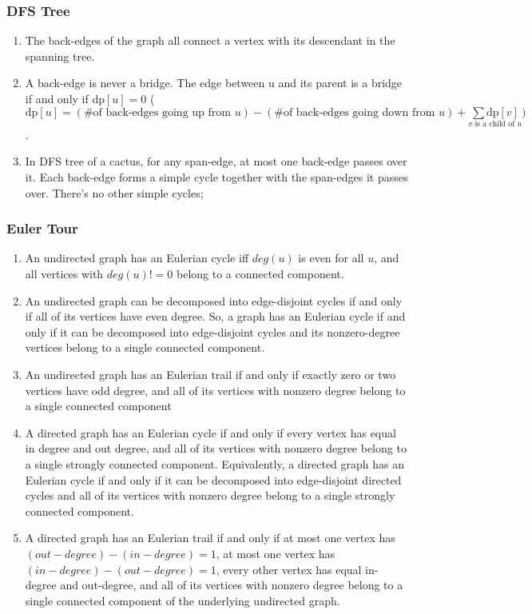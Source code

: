 \subsubsection{DFS Tree}
\begin{enumerate}
	\setlength\itemsep{-0.5em}
	\item The back-edges of the graph all connect a vertex with its descendant in the spanning tree.
	\item A back-edge is never a bridge. The edge between u and its parent is a bridge if and only if $\mathrm{dp}[u] = 0$ ( $\mathrm{dp}[u] = (\text{\# of back-edges going up from } u) - (\text{\# of back-edges going down from } u) + \underset{v \text{ is a child of } u}{\sum \mathrm{dp}[v]} )$.
	\item In DFS tree of a cactus, for any span-edge, at most one back-edge passes over it. Each back-edge forms a simple cycle together with the span-edges it passes over. There's no other simple cycles;
\end{enumerate}
\subsubsection{Euler Tour}
\begin{enumerate}
	\setlength\itemsep{-0.5em}
	\item An undirected graph has an Eulerian cycle iff $deg(u)$ is even for all $u$, and all vertices with $deg(u)!=0$ belong to a connected component.
	\item An undirected graph can be decomposed into edge-disjoint cycles if and only if all of its vertices have even degree. So, a graph has an Eulerian cycle if and only if it can be decomposed into edge-disjoint cycles and its nonzero-degree vertices belong to a single connected component.
	\item An undirected graph has an Eulerian trail if and only if exactly zero or two vertices have odd degree, and all of its vertices with nonzero degree belong to a single connected component
	\item A directed graph has an Eulerian cycle if and only if every vertex has equal in degree and out degree, and all of its vertices with nonzero degree belong to a single strongly connected component. Equivalently, a directed graph has an Eulerian cycle if and only if it can be decomposed into edge-disjoint directed cycles and all of its vertices with nonzero degree belong to a single strongly connected component.
	\item A directed graph has an Eulerian trail if and only if at most one vertex has $(out-degree) − (in-degree) = 1$, at most one vertex has $(in-degree) − (out-degree) = 1$, every other vertex has equal in-degree and out-degree, and all of its vertices with nonzero degree belong to a single connected component of the underlying undirected graph.
\end{enumerate}

